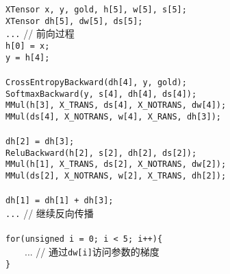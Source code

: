 \begin{tcolorbox}
[bicolor,sidebyside,width=13cm,righthand width=4cm,size=title,frame engine=empty,
 colback=blue!10!white,colbacklower=black!5!white]
 {\scriptsize
\begin{tabbing}
\texttt{XTensor x, y, gold, h[5], w[5], s[5];} \\
\texttt{XTensor dh[5], dw[5], ds[5];} \\
\texttt{...} // 前向过程 \\
\texttt{h[0] = x;} \\
\texttt{y = h[4];} \\


\texttt{} \\
\texttt{CrossEntropyBackward(dh[4], y, gold);} \\
\texttt{SoftmaxBackward(y, s[4], dh[4], ds[4]);}\\
\texttt{MMul(h[3], {\scriptsize X\_TRANS}, ds[4], {\scriptsize X\_NOTRANS}, dw[4]);}\\
\texttt{MMul(ds[4], {\scriptsize X\_NOTRANS}, w[4], {\scriptsize X\_RANS}, dh[3]);}\\



\texttt{} \\
\texttt{dh[2] = dh[3];}\\
\texttt{ReluBackward(h[2], s[2], dh[2], ds[2]);}\\
\texttt{MMul(h[1], {\scriptsize X\_TRANS}, ds[2], {\scriptsize X\_NOTRANS}, dw[2]);}\\
\texttt{MMul(ds[2], {\scriptsize X\_NOTRANS}, w[2], {\scriptsize X\_TRANS}, dh[2]);}\\



\texttt{} \\
\texttt{dh[1] = dh[1] + dh[3];}\\



\texttt{...} // 继续反向传播 \\
\texttt{} \\
\texttt{for(unsigned i = 0; i < 5; i++)\{} \\
\texttt{} \ \ \ \ ... // 通过{\texttt{dw[i]}}访问参数的梯度\\
\texttt{\}}


\end{tabbing}
}
\tcblower
\begin{center}
\begin{tikzpicture}



\end{tikzpicture}
\end{center}
\end{tcolorbox}
